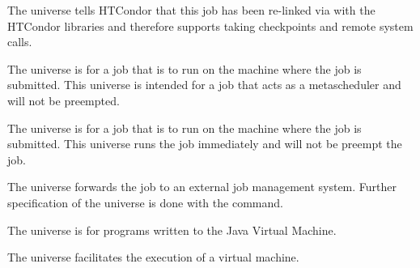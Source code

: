 \begin{description}
The  universe tells HTCondor that this job has been
re-linked via  with the HTCondor libraries and therefore
supports taking checkpoints and remote system calls.

The  universe is for a job that is to run on the
machine where the job is submitted.
This universe is intended for a job that acts as a metascheduler
and will not be preempted.

The  universe is for a job that is to run on the
machine where the job is submitted.
This universe runs the job immediately and will not be preempt the job.

The  universe forwards the job to an external job
management system.
Further specification of the  universe is done with the
 command.

The  universe is for programs written to the Java Virtual Machine.

The  universe facilitates the execution of a virtual
machine.

\end{description} 


